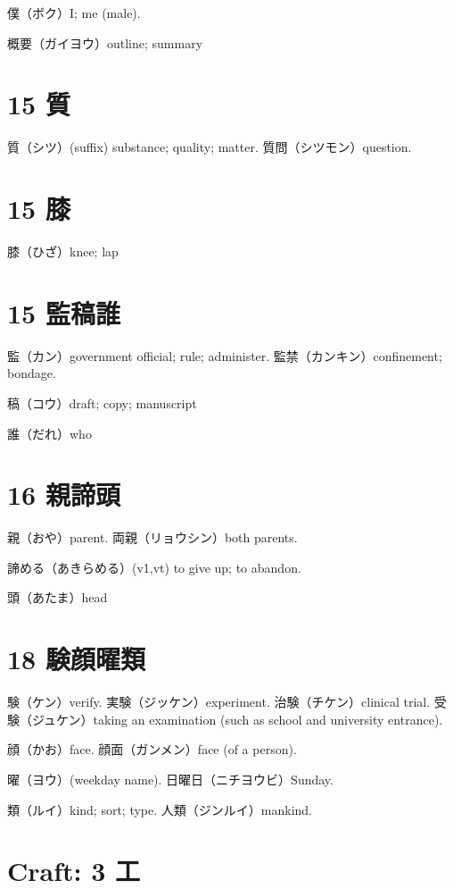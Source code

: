 僕（ボク）I; me (male).

概要（ガイヨウ）outline; summary

\section{15 質}

質（シツ）(suffix) substance; quality; matter.
質問（シツモン）question.

\section{15 膝}

膝（ひざ）knee; lap

\section{15 監稿誰}

監（カン）government official; rule; administer.
監禁（カンキン）confinement; bondage.

稿（コウ）draft; copy; manuscript

誰（だれ）who

\section{16 親諦頭}

親（おや）parent.
両親（リョウシン）both parents.

諦める（あきらめる）(v1,vt)
to give up; to abandon.

頭（あたま）head

\section{18 験顔曜類}

験（ケン）verify.
実験（ジッケン）experiment.
治験（チケン）clinical trial.
受験（ジュケン）taking an examination (such as school and university entrance).

顔（かお）face.
顔面（ガンメン）face (of a person).

曜（ヨウ）(weekday name).
日曜日（ニチヨウビ）Sunday.

類（ルイ）kind; sort; type.
人類（ジンルイ）mankind.

\section{Craft: 3 工}

